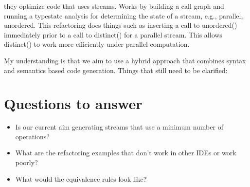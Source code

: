 \documentclass[runningheads,a4paper]{llncs}
\begin{document}
\cite{DBLP:conf/scam/KhatchadourianT18} they optimize code that uses
streams. Works by building a call graph and running a typestate
analysis for determining the state of a stream, e.g., parallel,
unordered.  This refactoring does things such as inserting a call to
unordered() immediately prior to a call to distinct() for a parallel
stream.  This allows distinct() to work more efficiently under
parallel computation.

My understanding is that we aim to use a hybrid approach that combines
syntax and semantics based code generation. Things that still need to
be clarified:
\section{Questions to answer}

\begin{itemize}
\item Is our current aim generating streams that use a 
minimum number of operations?

\item  What are the refactoring examples that don't work in other IDEs or
  work poorly?

\item What would the equivalence rules look like?
\end{itemize}
  
\end{document}
